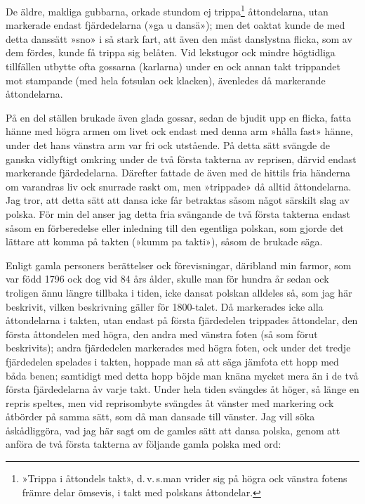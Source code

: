 {De äldre, makliga gubbarna, orkade stundom ej trippa\footnote{»Trippa i åttondels takt», d.\,v.\,s.\@ man vrider sig på högra ock vänstra fotens främre delar ömsevis, i takt med polskans åttondelar.} åttondelarna, utan markerade endast fjärdedelarna (»ga u dansä»); men det oaktat kunde de med detta danssätt »sno» i så stark fart, att även den mäst danslystna flicka, som av dem fördes, kunde få trippa sig belåten. Vid lekstugor ock mindre högtidliga tillfällen utbytte ofta gossarna (karlarna) under en ock annan takt trippandet mot stampande (med hela fotsulan ock klacken), ävenledes då markerande åttondelarna.

På en del ställen brukade även glada gossar, sedan de bjudit upp en flicka, fatta hänne med högra armen om livet ock endast med denna arm »hålla fast» hänne, under det hans vänstra arm var fri ock utstående. På detta sätt svängde de ganska vidlyftigt omkring under de två första takterna av reprisen, därvid endast markerande fjärdedelarna. Därefter fattade de även med de hittils fria händerna om varandras liv ock snurrade raskt om, men »trippade» då alltid åttondelarna. Jag tror, att detta sätt att dansa icke får betraktas såsom något särskilt slag av polska. För min del anser jag detta fria svängande de två första takterna endast såsom en förberedelse eller inledning till den egentliga polskan, som gjorde det lättare att komma på takten (»kumm pa takti»), såsom de brukade säga.

Enligt gamla personers berättelser ock förevisningar, däribland
min farmor, som var född 1796 ock dog vid 84 års ålder, skulle man för hundra år sedan ock troligen ännu längre tillbaka i tiden, icke dansat polskan alldeles så, som jag här beskrivit, vilken beskrivning gäller för 1800-talet. Då markerades icke alla åttondelarna i takten, utan endast på första fjärdedelen trippades åttondelar, den första åttondelen med högra, den andra med vänstra foten (så som förut beskrivits); andra fjärdedelen markerades med högra foten, ock under det tredje fjärdedelen spelades i takten, hoppade man så att säga jämfota ett hopp med båda benen; samtidigt med detta hopp böjde man knäna mycket mera än i de två första fjärdedelarna åv varje takt. Under hela tiden svängdes åt höger, så länge en repris speltes, men vid reprisombyte
svängdes åt vänster med markering ock åtbörder på samma sätt, som då man dansade till vänster. Jag vill söka åskådliggöra, vad jag här sagt om de gamles sätt att dansa polska, genom att anföra de två första takterna av följande gamla polska med ord:

}
